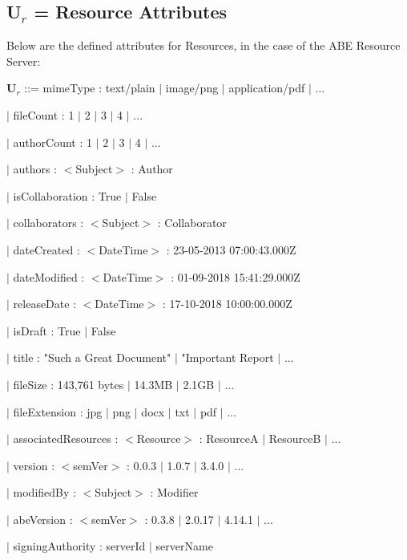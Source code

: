 \documentclass[a4paper,11pt]{article}
\begin{document}
\subsection{U$_{r}$ = Resource Attributes}
Below are the defined attributes for Resources, in the case of the ABE Resource Server:\\\par
\textbf{U$_{r}$} ::= mimeType : text/plain $|$ image/png $|$ application/pdf $|$ ... \par
\hspace{1.05cm}$|$ fileCount : 1 $|$ 2 $|$ 3 $|$ 4 $|$ ... \par
\hspace{1.05cm}$|$ authorCount : 1 $|$ 2 $|$ 3 $|$ 4 $|$ ... \par
\hspace{1.05cm}$|$ authors : $<$Subject$>$ : Author  \par
\hspace{1.05cm}$|$ isCollaboration : True $|$ False \par
\hspace{1.05cm}$|$ collaborators : $<$Subject$>$ : Collaborator  \par
\hspace{1.05cm}$|$ dateCreated : $<$DateTime$>$ : 23-05-2013 07:00:43.000Z \par
\hspace{1.05cm}$|$ dateModified : $<$DateTime$>$ : 01-09-2018 15:41:29.000Z \par
\hspace{1.05cm}$|$ releaseDate : $<$DateTime$>$ : 17-10-2018 10:00:00.000Z \par
\hspace{1.05cm}$|$ isDraft :  True $|$ False \par
\hspace{1.05cm}$|$ title :  "Such a Great Document" $|$ "Important Report $|$ ... \par
\hspace{1.05cm}$|$ fileSize : 143,761 bytes $|$ 14.3MB $|$ 2.1GB $|$ ... \par
\hspace{1.05cm}$|$ fileExtension : jpg $|$ png $|$ docx $|$ txt $|$ pdf $|$ ... \par
\hspace{1.05cm}$|$ associatedResources : $<$Resource$>$ : ResourceA $|$ ResourceB $|$ ... \par
\hspace{1.05cm}$|$ version : $<$semVer$>$ : 0.0.3 $|$ 1.0.7 $|$ 3.4.0 $|$ ... \par
\hspace{1.05cm}$|$ modifiedBy : $<$Subject$>$ : Modifier  \par
\hspace{1.05cm}$|$ abeVersion : $<$semVer$>$ : 0.3.8 $|$ 2.0.17 $|$ 4.14.1 $|$ ...  \par
\hspace{1.05cm}$|$ signingAuthority : serverId $|$ serverName \par
\end{document}
